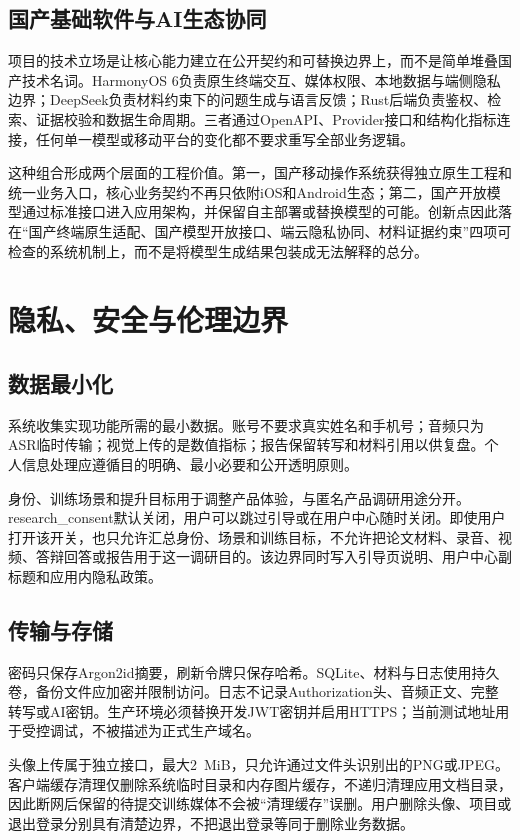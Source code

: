 \section{国产基础软件与AI生态协同}
项目的技术立场是让核心能力建立在公开契约和可替换边界上，而不是简单堆叠国产技术名词。HarmonyOS 6负责原生终端交互、媒体权限、本地数据与端侧隐私边界；DeepSeek负责材料约束下的问题生成与语言反馈；Rust后端负责鉴权、检索、证据校验和数据生命周期。三者通过OpenAPI、Provider接口和结构化指标连接，任何单一模型或移动平台的变化都不要求重写全部业务逻辑。

这种组合形成两个层面的工程价值。第一，国产移动操作系统获得独立原生工程和统一业务入口，核心业务契约不再只依附iOS和Android生态；第二，国产开放模型通过标准接口进入应用架构，并保留自主部署或替换模型的可能。创新点因此落在“国产终端原生适配、国产模型开放接口、端云隐私协同、材料证据约束”四项可检查的系统机制上，而不是将模型生成结果包装成无法解释的总分。

\chapter{隐私、安全与伦理边界}
\section{数据最小化}
系统收集实现功能所需的最小数据。账号不要求真实姓名和手机号；音频只为ASR临时传输；视觉上传的是数值指标；报告保留转写和材料引用以供复盘。个人信息处理应遵循目的明确、最小必要和公开透明原则\cite{pipl}。

身份、训练场景和提升目标用于调整产品体验，与匿名产品调研用途分开。research\_consent默认关闭，用户可以跳过引导或在用户中心随时关闭。即使用户打开该开关，也只允许汇总身份、场景和训练目标，不允许把论文材料、录音、视频、答辩回答或报告用于这一调研目的。该边界同时写入引导页说明、用户中心副标题和应用内隐私政策。

\section{传输与存储}
密码只保存Argon2id摘要，刷新令牌只保存哈希。SQLite、材料与日志使用持久卷，备份文件应加密并限制访问。日志不记录Authorization头、音频正文、完整转写或AI密钥。生产环境必须替换开发JWT密钥并启用HTTPS；当前测试地址用于受控调试，不被描述为正式生产域名。

头像上传属于独立接口，最大2~MiB，只允许通过文件头识别出的PNG或JPEG。客户端缓存清理仅删除系统临时目录和内存图片缓存，不递归清理应用文档目录，因此断网后保留的待提交训练媒体不会被“清理缓存”误删。用户删除头像、项目或退出登录分别具有清楚边界，不把退出登录等同于删除业务数据。


